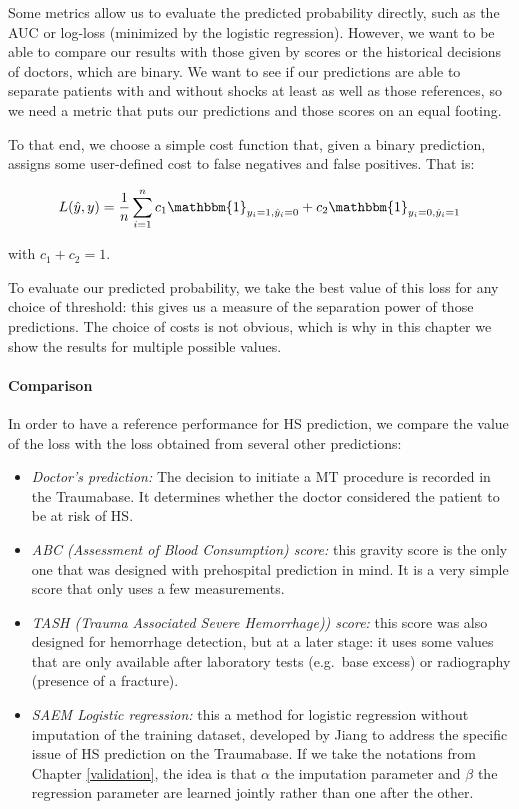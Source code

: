 Some metrics allow us to evaluate the predicted probability directly, such as the AUC \cite{huang2005AUC} or log-loss (minimized by the logistic regression). However, we want to be able to compare our results with those given by scores or the historical decisions of doctors, which are binary. We want to see if our predictions are able to separate patients with and without shocks at least as well as those references, so we need a metric that puts our predictions and those scores on an equal footing.

To that end, we choose a simple cost function that, given a binary prediction, assigns some user-defined cost to false negatives and false positives. That is:

$$ L(\hat{y}, y)=\frac{1}{n} \sum \limits_{i=1}^n c_1 \mathbbm{1}_{y_i=1,\hat{y}_i=0} + c_2 \mathbbm{1}_{y_i=0,\hat{y}_i=1}$$

with $c_1 + c_2 = 1$.

To evaluate our predicted probability, we take the best value of this loss for any choice of threshold: this gives us a measure of the separation power of those predictions. The choice of costs is not obvious, which is why in this chapter we show the results for multiple possible values.

\paragraph{Comparison}
In order to have a reference performance for HS prediction, we compare the value of the loss with the loss obtained from several other predictions:
\begin{itemize}
\item \emph{Doctor's prediction:} The decision to initiate a MT procedure is recorded in the Traumabase. It determines whether the doctor considered the patient to be at risk of HS.
\item \emph{ABC (Assessment of Blood Consumption)\cite{nunez2009ABC} score:} this gravity score is the only one that was designed with prehospital prediction in mind. It is a very simple score that only uses a few measurements.
\item \emph{TASH (Trauma Associated Severe Hemorrhage)\cite{yucel2006tash}) score:} this score was also designed for hemorrhage detection, but at a later stage: it uses some values that are only available after laboratory tests (e.g.\ base excess) or radiography (presence of a fracture).
\item \emph{SAEM Logistic regression:} this a method for logistic regression without imputation of the training dataset, developed by Jiang \cite{jiangsaem} to address the specific issue of HS prediction on the Traumabase. If we take the notations from Chapter \ref{validation}, the idea is that $\alpha$ the imputation parameter and $\beta$ the regression parameter are learned jointly rather than one after the other. 
\end{itemize}

